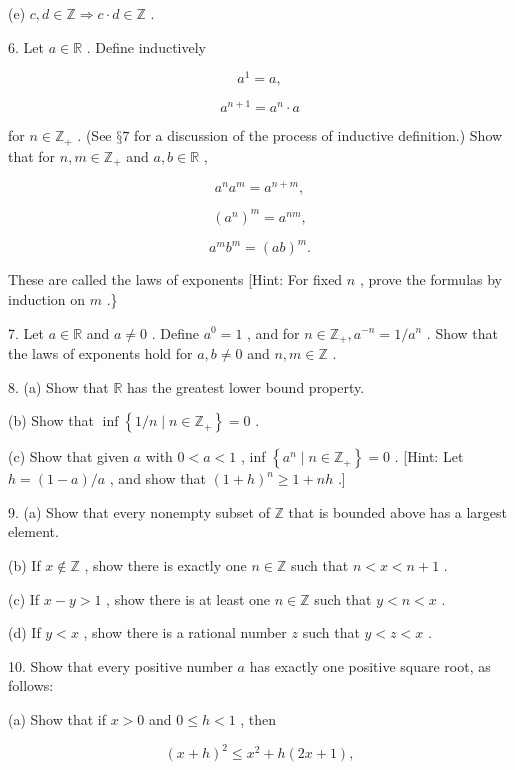 (e) \(c,d \in  \mathbb{Z} \Rightarrow  c \cdot  d \in  \mathbb{Z}\) .

6. Let \(a \in  \mathbb{R}\) . Define inductively

\[
{a}^{1} = a,
\]

\[
{a}^{n + 1} = {a}^{n} \cdot  a
\]

for \(n \in  {\mathbb{Z}}_{ + }\) . (See \(§7\) for a discussion of the process of inductive definition.) Show that for \(n,m \in  {\mathbb{Z}}_{ + }\) and \(a,b \in  \mathbb{R}\) ,

\[
{a}^{n}{a}^{m} = {a}^{n + m},
\]

\[
{\left( {a}^{n}\right) }^{m} = {a}^{nm},
\]

\[
{a}^{m}{b}^{m} = {\left( ab\right) }^{m}.
\]

These are called the laws of exponents [Hint: For fixed \(n\) , prove the formulas by induction on \(m\) .\}

7. Let \(a \in  \mathbb{R}\) and \(a \neq  0\) . Define \({a}^{0} = 1\) , and for \(n \in  {\mathbb{Z}}_{ + },{a}^{-n} = 1/{a}^{n}\) . Show that the laws of exponents hold for \(a,b \neq  0\) and \(n,m \in  \mathbb{Z}\) .

8. (a) Show that \(\mathbb{R}\) has the greatest lower bound property.

(b) Show that \(\inf \left\{  {1/n \mid  n \in  {\mathbb{Z}}_{ + }}\right\} = 0\) .

(c) Show that given \(a\) with \(0 < a < 1\) , inf \(\left\{  {{a}^{n} \mid  n \in  {\mathbb{Z}}_{ + }}\right\} = 0\) . [Hint: Let \(h = \left( {1 - a}\right) /a\) , and show that \({\left( 1 + h\right) }^{n} \geq  1 + {nh}\) .]

9. (a) Show that every nonempty subset of \(\mathbb{Z}\) that is bounded above has a largest element.

(b) If \(x \notin  \mathbb{Z}\) , show there is exactly one \(n \in  \mathbb{Z}\) such that \(n < x < n + 1\) .

(c) If \(x - y > 1\) , show there is at least one \(n \in  \mathbb{Z}\) such that \(y < n < x\) .

(d) If \(y < x\) , show there is a rational number \(z\) such that \(y < z < x\) .

10. Show that every positive number \(a\) has exactly one positive square root, as follows:

(a) Show that if \(x > 0\) and \(0 \leq  h < 1\) , then

\[
{\left( x + h\right) }^{2} \leq  {x}^{2} + h\left( {{2x} + 1}\right) ,
\]

